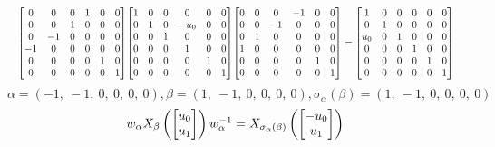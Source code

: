 \documentclass[11pt]{article}
\theoremstyle{definition}
\begin{document}
\[
\scaletoalign{\textwidth}{{\left[\begin{matrix}0 & 0 & 0 & 1 & 0 & 0\\0 & 0 & 1 & 0 & 0 & 0\\0 & -1 & 0 & 0 & 0 & 0\\-1 & 0 & 0 & 0 & 0 & 0\\0 & 0 & 0 & 0 & 1 & 0\\0 & 0 & 0 & 0 & 0 & 1\end{matrix}\right]} {\left[\begin{matrix}1 & 0 & 0 & 0 & 0 & 0\\0 & 1 & 0 & - u_{0} & 0 & 0\\0 & 0 & 1 & 0 & 0 & 0\\0 & 0 & 0 & 1 & 0 & 0\\0 & 0 & 0 & 0 & 1 & 0\\0 & 0 & 0 & 0 & 0 & 1\end{matrix}\right]} {\left[\begin{matrix}0 & 0 & 0 & -1 & 0 & 0\\0 & 0 & -1 & 0 & 0 & 0\\0 & 1 & 0 & 0 & 0 & 0\\1 & 0 & 0 & 0 & 0 & 0\\0 & 0 & 0 & 0 & 1 & 0\\0 & 0 & 0 & 0 & 0 & 1\end{matrix}\right]} = {\left[\begin{matrix}1 & 0 & 0 & 0 & 0 & 0\\0 & 1 & 0 & 0 & 0 & 0\\u_{0} & 0 & 1 & 0 & 0 & 0\\0 & 0 & 0 & 1 & 0 & 0\\0 & 0 & 0 & 0 & 1 & 0\\0 & 0 & 0 & 0 & 0 & 1\end{matrix}\right]}}
\]
\[
\alpha = \left( -1, \  -1, \  0, \  0, \  0, \  0\right), \beta = \left( 1, \  -1, \  0, \  0, \  0, \  0\right), \sigma_{\alpha}(\beta) = \left( 1, \  -1, \  0, \  0, \  0, \  0\right)
\]
\[
\scaletoalign{\textwidth}{w_{\alpha} X_{\beta}\left(\left[\begin{matrix}u_{0}\\u_{1}\end{matrix}\right]\right) w_{\alpha}^{-1} = X_{\sigma_{\alpha}\left(\beta\right)}\left(\left[\begin{matrix}- u_{0}\\u_{1}\end{matrix}\right]\right)}
\]
\end{document}
